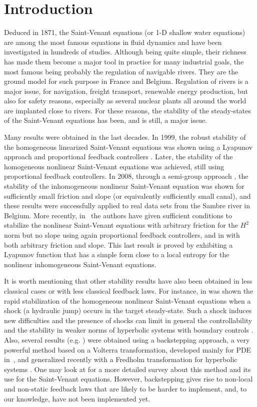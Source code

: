\section*{Introduction}
{Deduced} in 1871, the Saint-Venant equations \cite{SaintVenant} (or 1-D shallow water equations) are among the most famous equations in fluid dynamics and have been investigated in hundreds of studies.
Although being quite simple, their richness has made them become a major tool in practice for many industrial goals, the most famous being probably the regulation of navigable rivers.
They are the ground model for such purpose in France and Belgium.
Regulation of rivers
is a major issue, for navigation, freight transport,
renewable energy production,
but also for safety reasons, especially as
several nuclear plants all around the world are implanted close to rivers.
For these reasons, the stability of the steady-states of the Saint-Venant equations has been, and is still, a major issue.

Many results were obtained in the last decades.
In 1999, the robust stability of the homogeneous linearized Saint-Venant equations was shown using a Lyapunov approach and proportional feedback controllers \cite{coron1999}.
Later, the stability of the homogeneous nonlinear Saint-Venant equations was achieved, still using proportional feedback controllers.
In 2008, through a semi-group approach \cite{dos2008}, the stability of the inhomogeneous nonlinear Saint-Venant equation was shown for sufficiently small friction and slope (or equivalently sufficiently small canal), and these results were successfully applied to real data sets from the Sambre river in Belgium.
More recently, in~\cite{BC2017} the authors have given sufficient conditions to stabilize the nonlinear Saint-Venant equations with arbitrary friction for the $H^{2}$ norm but no slope using again proportional feedback controllers,
and in \cite{HS} with both arbitrary friction and slope.
This last result is proved by exhibiting {a Lyapunov function that has a simple form close to a local entropy} for the nonlinear inhomogeneous Saint-Venant equations.

It is worth mentioning that other stability results have also been obtained in less classical cases or with less classical feedback laws.
For instance, in \cite{stvenantjump} was shown the rapid stabilization of the homogeneous nonlinear Saint-Venant equations when a shock (\eg a hydraulic jump) occurs in the target steady-state.
Such {a} shock indu\-ces new difficulties and the presence of shocks can limit in general the controllability and the stability in weaker norms of hyperbolic systems
with boundary controls
\hbox{\cite{ABG,BG}}.
Also, several results (e.g.
\cite{CVBK})
were obtained using a backstepping approach, a very powerful method based on a Volterra transformation, developed mainly for PDE in~\cite{KrsticBook},
and generalized recently with a Fredholm transformation for hyperbolic systems \hbox{\cite{CoronFredholm,Zhang,Zhang2}}.
One may look at \cite{HS} for a more detailed survey about this method and its use for the Saint-Venant equations.
However, backstepping gives rise to non-local and non-static feedback laws that are likely to be harder to implement, and, to our knowledge, have not been implemented yet.

